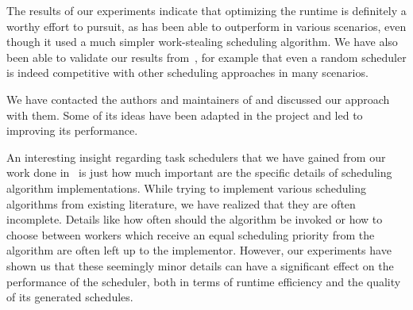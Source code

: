 The results of our experiments indicate that optimizing the runtime is definitely a worthy effort
to pursuit, as \rsds{} has been able to outperform \dask{}
in various scenarios, even though it used a much simpler work-stealing scheduling algorithm. We
have also been able to validate our results from~\cite{estee}, for example that even
a random scheduler is indeed competitive with other scheduling approaches in many scenarios.

We have contacted the authors and maintainers of \dask{} and discussed our
\rsds{} approach with
them. Some of its
ideas have been adapted in the \dask{} project and led to improving its
performance.

An interesting insight regarding task schedulers that we have gained from our work done
in~\cite{estee,rsds} is just how much important are the specific details of scheduling
algorithm implementations. While trying to implement various scheduling algorithms from existing
literature, we have realized that they are often incomplete. Details like how often should the
algorithm be invoked or how to choose between workers which receive an equal scheduling priority
from the algorithm are often left up to the implementor. However, our experiments have shown us
that these seemingly minor details can have a significant effect on the performance of the
scheduler, both in terms of runtime efficiency and the quality of its generated schedules.
